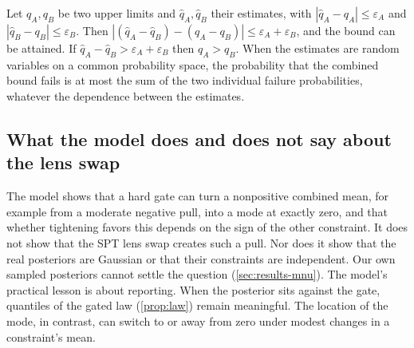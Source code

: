 \begin{proposition}\label{prop:readout}
Let $q_A,q_B$ be two upper limits and $\hat q_A,\hat q_B$ their estimates, with $|\hat q_A-q_A|\le\varepsilon_A$ and $|\hat q_B-q_B|\le\varepsilon_B$. Then $|(\hat q_A-\hat q_B)-(q_A-q_B)|\le\varepsilon_A+\varepsilon_B$, and the bound can be attained. If $\hat q_A-\hat q_B>\varepsilon_A+\varepsilon_B$ then $q_A>q_B$. When the estimates are random variables on a common probability space, the probability that the combined bound fails is at most the sum of the two individual failure probabilities, whatever the dependence between the estimates.
\end{proposition}

\subsection{What the model does and does not say about the lens swap}
The model shows that a hard gate can turn a nonpositive combined mean, for example from a moderate negative pull, into a mode at exactly zero, and that whether tightening favors this depends on the sign of the other constraint. It does not show that the SPT lens swap creates such a pull. Nor does it show that the real posteriors are Gaussian or that their constraints are independent. Our own sampled posteriors cannot settle the question (\cref{sec:results-mnu}). The model's practical lesson is about reporting. When the posterior sits against the gate, quantiles of the gated law (\cref{prop:law}) remain meaningful. The location of the mode, in contrast, can switch to or away from zero under modest changes in a constraint's mean.
